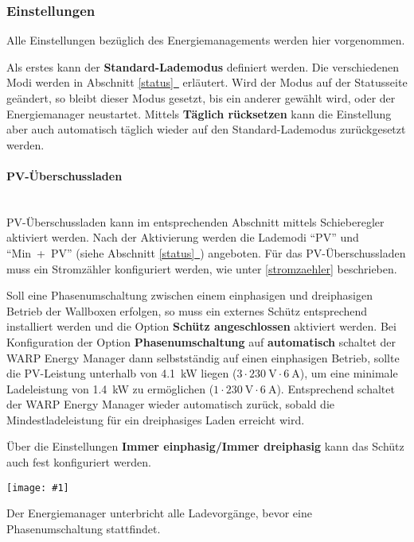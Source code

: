 \documentclass[a4paper,10pt]{article}
\newcommand{\gfx}[1]{\texttt{[image: \#1]}}
\newcommand*{\fullref}[1]{Abschnitt \hyperref[{#1}]{\ref*{#1}~\nameref*{#1}}}
\begin{document}
\begin{multicols*}{2}
	\subsubsection{Einstellungen}
	\label{energy_manager_settings}

	Alle Einstellungen bezüglich des Energiemanagements werden hier vorgenommen.

	Als erstes kann der \textbf{Standard-Lademodus} definiert werden. Die
	verschiedenen Modi werden in \fullref{status} erläutert.
	Wird der Modus auf der Statusseite geändert, so bleibt dieser Modus gesetzt, bis ein anderer gewählt wird,
	oder der Energiemanager neustartet.
	Mittels \textbf{Täglich rücksetzen} kann die Einstellung aber auch
	automatisch täglich wieder auf den Standard-Lademodus zurückgesetzt werden.

	\vspace{-0.2cm}
	\paragraph{PV-Überschussladen}\ \\
	PV-Überschussladen kann im entsprechenden Abschnitt mittels
	Schieberegler aktiviert werden. Nach der Aktivierung werden die Lademodi
	\enquote{PV} und \enquote{Min~+~PV} (siehe \fullref{status}) angeboten. Für das PV-Überschussladen muss ein	Stromzähler konfiguriert werden, wie unter \ref{stromzaehler} beschrieben.

	Soll eine Phasenumschaltung zwischen einem einphasigen und dreiphasigen Betrieb
	der Wallboxen erfolgen, so muss ein externes Schütz entsprechend installiert
	werden und die Option \textbf{Schütz angeschlossen} aktiviert werden. Bei
	Konfiguration der Option \textbf{Phasenumschaltung} auf \textbf{automatisch}
	schaltet der WARP Energy Manager dann selbstständig auf einen einphasigen
	Betrieb, sollte die PV-Leistung unterhalb von \SI{4,1}{\kilo\watt} liegen ($3\cdot\SI{230}{\volt}\cdot\SI{6}{\ampere}$), um
	eine minimale Ladeleistung von \SI{1,4}{\kilo\watt} zu ermöglichen ($1\cdot\SI{230}{\volt}\cdot\SI{6}{\ampere}$).
	Entsprechend schaltet der WARP Energy Manager wieder automatisch zurück,
	sobald die Mindestladeleistung für ein dreiphasiges Laden erreicht wird.

	Über die Einstellungen \textbf{Immer einphasig/Immer dreiphasig} kann das
	Schütz auch fest konfiguriert werden.

	\gfx{./img/resized/web_em_settings}

	Der Energiemanager unterbricht alle Ladevorgänge, bevor eine
	Phasenumschaltung stattfindet.


\end{multicols*}
\end{document}
